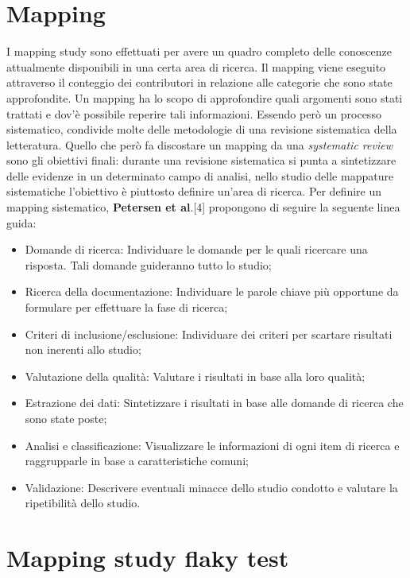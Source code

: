 \section{Mapping}
I mapping study sono effettuati per avere un quadro completo
delle conoscenze attualmente disponibili in una certa area di ricerca. Il mapping viene eseguito attraverso il conteggio dei contributori in relazione alle categorie che sono state approfondite. Un mapping ha lo scopo di approfondire quali argomenti
sono stati trattati e dov’è possibile reperire tali informazioni. Essendo però un processo sistematico, condivide molte delle metodologie di una revisione sistematica della letteratura. Quello che però fa discostare un mapping da una
\emph{systematic review} sono gli obiettivi finali: durante una revisione sistematica si punta a sintetizzare delle evidenze in un determinato campo di analisi, nello studio delle
mappature sistematiche l’obiettivo è piuttosto definire un'area di ricerca.
Per definire un mapping sistematico, \textbf{Petersen et al}.[4] propongono di seguire la seguente linea guida:
\begin{itemize}
	\item Domande di ricerca: Individuare le domande per le quali ricercare una risposta. Tali domande guideranno tutto lo studio;
	\item Ricerca della documentazione: Individuare le parole chiave più opportune da formulare per effettuare la fase di ricerca;
	\item Criteri di inclusione/esclusione: Individuare dei criteri per scartare risultati non inerenti allo studio;
	\item Valutazione della qualità: Valutare i risultati in base alla loro qualità;
	\item Estrazione dei dati: Sintetizzare i risultati in base alle domande di ricerca che sono state poste;
	\item Analisi e classificazione: Visualizzare le informazioni di ogni item di ricerca e raggrupparle in base a caratteristiche comuni;
	\item Validazione: Descrivere eventuali minacce dello studio condotto e valutare la ripetibilità dello studio.
\end{itemize}
\section{Mapping study flaky test}
